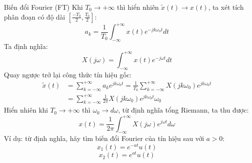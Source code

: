 \documentclass[8pt]{beamer}
\begin{document}
\begin{frame}{Biến đổi Fourier (FT)}
	Khi $T_{0}\to+\infty$ thì hiển nhiên $\widetilde{x}(t)\to x(t)$, ta xét tích phân đoạn có độ dài $[\frac{-T_{0}}{2},\frac{T_{0}}{2}]$:
\begin{equation*}
a_{k}=\frac{1}{T_{0}}\int_{-\infty}^{+\infty}x(t)e^{-jk\omega_{0}t}dt
\end{equation*}
Ta định nghĩa:
$$X(j\omega)=\int_{-\infty}^{+\infty}x(t)e^{-j\omega t}dt$$
Quay ngược trở lại công thức tín hiệu gốc:
\begin{equation*}
\begin{split}
	\widetilde{x}(t)&=\sum_{k=-\infty}^{+\infty}a_{k}e^{jk\omega_{0}t}=\frac{1}{T_{0}}\sum_{k=-\infty}^{+\infty}X(jk\omega_{0})e^{jk\omega_{0}t}\\
			&=\sum_{k=-\infty}^{+\infty}\frac{1}{2\pi}X(jk\omega_{0})e^{jk\omega_{0}t}\omega_{0}
\end{split}
\end{equation*}
Hiển nhiên khi $T_{0}\to+\infty$ thì $\omega_{0}\to d\omega$, từ định nghĩa tổng Riemann, ta thu được:
$$x(t)=\frac{1}{2\pi}\int_{-\infty}^{+\infty}X(j\omega)e^{j\omega t}d\omega$$
Ví dụ: từ định nghĩa, hãy tìm biến đổi Fourier của tín hiệu sau với $a>0$:
$$x_{1}(t)=e^{-at}u(t)$$
$$x_{2}(t)=e^{at}u(t)$$

\end{frame}
\end{document}
